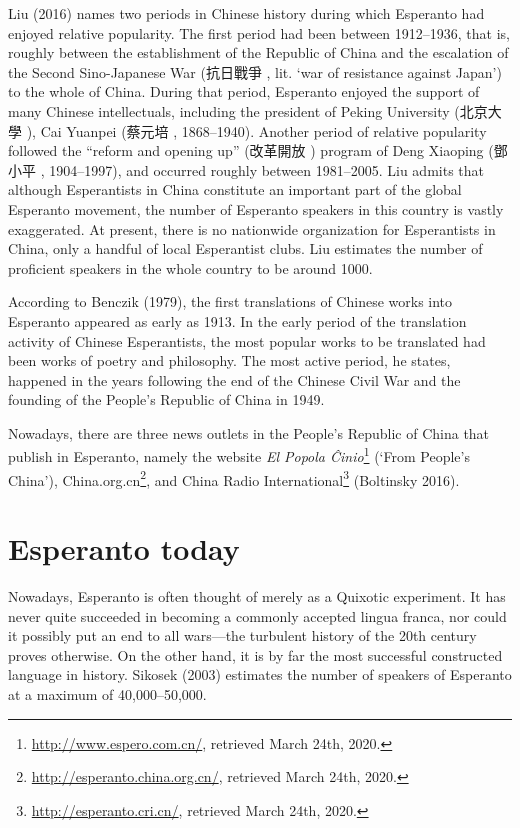 Liu (2016) names two periods in Chinese history during which Esperanto had enjoyed relative popularity.
The first period had been between 1912--1936, that is, roughly between the establishment of the Republic of China and the escalation of the Second Sino-Japanese War (抗日戰爭 , lit. `war of resistance against Japan') to the whole of China.
During that period, Esperanto enjoyed the support of many Chinese intellectuals, including the president of Peking University (北京大學 ), Cai Yuanpei (蔡元培 , 1868--1940).
Another period of relative popularity followed the ``reform and opening up'' (改革開放 ) program of Deng Xiaoping (鄧小平 , 1904--1997), and occurred roughly between 1981--2005.
Liu admits that although Esperantists in China constitute an important part of the global Esperanto movement, the number of Esperanto speakers in this country is vastly exaggerated.
At present, there is no nationwide organization for Esperantists in China, only a handful of local Esperantist clubs.
Liu estimates the number of proficient speakers in the whole country to be around 1000.

According to Benczik (1979), the first translations of Chinese works into Esperanto appeared as early as 1913.
In the early period of the translation activity of Chinese Esperantists, the most popular works to be translated had been works of poetry and philosophy.
The most active period, he states, happened in the years following the end of the Chinese Civil War and the founding of the People's Republic of China in 1949.

Nowadays, there are three news outlets in the People's Republic of China that publish in Esperanto, namely the website \textit{El Popola Ĉinio}\footnote{\url{http://www.espero.com.cn/}, retrieved March 24th, 2020.} (`From People's China'), China.org.cn\footnote{\url{http://esperanto.china.org.cn/}, retrieved March 24th, 2020.},
and China Radio International\footnote{\url{http://esperanto.cri.cn/}, retrieved March 24th, 2020.}
(Boltinsky 2016).

\section{Esperanto today}
Nowadays, Esperanto is often thought of merely as a Quixotic experiment.
It has never quite succeeded in becoming a commonly accepted lingua franca, nor could it possibly put an end to all wars---the turbulent history of the 20th century proves otherwise.
On the other hand, it is by far the most successful constructed language in history.
Sikosek (2003) estimates the number of speakers of Esperanto at a maximum of 40,000--50,000.

